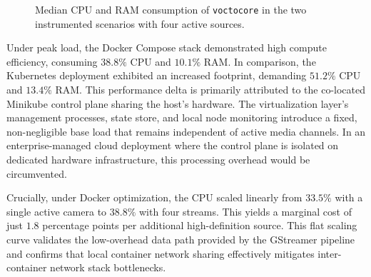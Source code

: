 \documentclass[electronics,article,submit,pdftex,moreauthors]{Definitions/mdpi}
\begin{document}
\begin{figure}[H]
\begin{center}
\end{center}
\caption{Median CPU and RAM consumption of \texttt{voctocore} in the two
instrumented scenarios with four active sources.\label{fig:cpu_ram}}
\end{figure}

Under peak load, the Docker Compose stack demonstrated high compute efficiency, consuming $38.8\%$ CPU and $10.1\%$ RAM. In comparison, the Kubernetes deployment exhibited an increased footprint, demanding $51.2\%$ CPU and $13.4\%$ RAM. This performance delta is primarily attributed to the co-located Minikube control plane sharing the host's hardware. The virtualization layer's management processes, state store, and local node monitoring introduce a fixed, non-negligible base load that remains independent of active media channels. In an enterprise-managed cloud deployment where the control plane is isolated on dedicated hardware infrastructure, this processing overhead would be circumvented.

Crucially, under Docker optimization, the CPU scaled linearly from $33.5\%$ with a single active camera to $38.8\%$ with four streams. This yields a marginal cost of just $1.8$ percentage points per additional high-definition source. This flat scaling curve validates the low-overhead data path provided by the GStreamer pipeline and confirms that local container network sharing effectively mitigates inter-container network stack bottlenecks.
\end{document}
